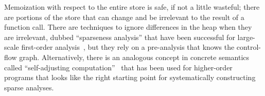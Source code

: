 Memoization with respect to the entire store is safe, if not a little wasteful; there are portions of the store that can change and be irrelevant to the result of a function call.
%
There are techniques to ignore differences in the heap when they are irrelevant, dubbed ``sparseness analysis'' that have been successful for large-scale first-order analysis~\citep{ianjohnson:DBLP:conf/pldi/OhHLLY12}, but they rely on a pre-analysis that knows the control-flow graph.
%
Alternatively, there is an analogous concept in concrete semantics called ``self-adjusting computation''~\citep{ianjohnson:DBLP:conf/afp/AcarL08} that has been used for higher-order programs that looks like the right starting point for systematically constructing sparse analyses.
%

